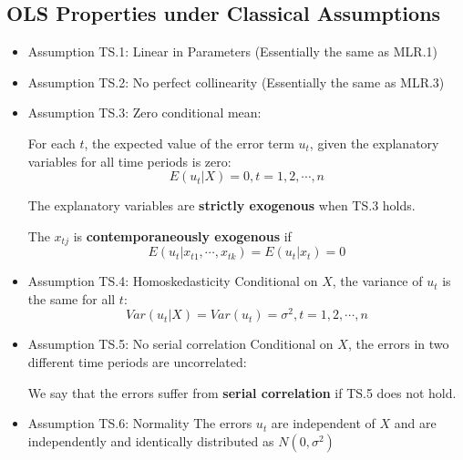 \documentclass[11pt,a4paper]{article}
\begin{document}
\subsection{OLS Properties under Classical Assumptions}
\begin{itemize}
    \item Assumption TS.1: Linear in Parameters (Essentially the same as MLR.1)
    \item Assumption TS.2: No perfect collinearity (Essentially the same as MLR.3)
    \item Assumption TS.3: Zero conditional mean: \par
        For each $t$, the expected value of the error term $u_t$, given the explanatory variables for all time periods is zero:
        \[
        E(u_t | X) = 0, t = 1, 2, \cdots, n
        \]

        The explanatory variables are \textbf{strictly exogenous} when TS.3 holds.\par
        The $x_{tj}$ is \textbf{contemporaneously exogenous} if 
        \[
        E(u_t | x_{t1}, \cdots, x_{tk}) = E(u_t | x_t) = 0
        \]

    
    \item Assumption TS.4: Homoskedasticity
        Conditional on $X$, the variance of $u_t$ is the same for all $t$:
        \[
        Var(u_t | X) = Var(u_t) = \sigma^2, t = 1, 2, \cdots, n
        \]

    \item Assumption TS.5: No serial correlation
        Conditional on $X$, the errors in two different time periods are uncorrelated:

        We say that the errors suffer from \textbf{serial correlation} if TS.5 does not hold.


    \item Assumption TS.6: Normality
        The errors $u_t$ are independent of $X$ and are independently and identically distributed as $N(0, \sigma^2)$


\end{itemize}
\end{document}
